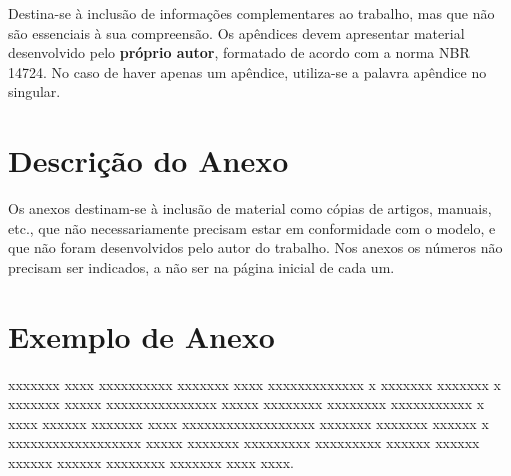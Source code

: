 \documentclass[ppgc,diss]{iiufrgs}
\begin{document}
Destina-se à inclusão de informações complementares ao trabalho, mas que não são essenciais à sua compreensão. Os apêndices devem apresentar material desenvolvido pelo \textbf{próprio autor}, formatado de acordo com a norma NBR 14724. No caso de haver apenas um apêndice, utiliza-se a palavra apêndice no singular.

\annex

\chapter{Descrição do Anexo}

Os anexos destinam-se à inclusão de material como cópias de artigos, manuais, etc., que não necessariamente precisam estar em conformidade com o modelo, e que não foram desenvolvidos pelo autor do trabalho. Nos anexos os números não precisam ser indicados, a não ser na página inicial de cada um. 

\chapter{Exemplo de Anexo}

xxxxxxx xxxx xxxxxxxxxx xxxxxxx xxxx xxxxxxxxxxxxx x xxxxxxx xxxxxxx x xxxxxxx xxxxx xxxxxxxxxxxxxxx xxxxx xxxxxxxx xxxxxxxx xxxxxxxxxxx x xxxx xxxxxx xxxxxxx xxxx xxxxxxxxxxxxxxxxxx xxxxxxx xxxxxxx xxxxxx x xxxxxxxxxxxxxxxxxx xxxxx xxxxxxx xxxxxxxxx xxxxxxxxx xxxxxx xxxxxx xxxxxx xxxxxx xxxxxxxx xxxxxxx xxxx xxxx.


\end{document}
